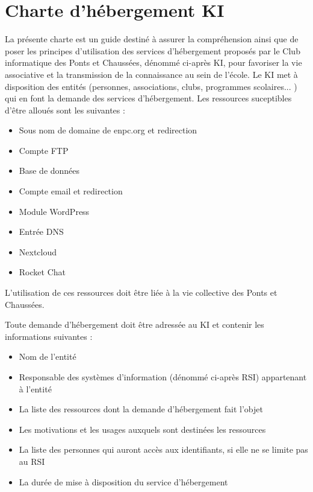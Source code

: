 \documentclass{ki019}
\begin{document}
\section{Charte d'hébergement KI}


La présente charte est un guide destiné à assurer la compréhension ainsi que de poser les principes d'utilisation des services d'hébergement proposés par le Club informatique des Ponts et Chaussées, dénommé ci-après KI, pour favoriser la vie associative et la transmission de la connaissance au sein de l'école. Le KI met à disposition des entités (personnes, associations, clubs, programmes scolaires... ) qui en font la demande des services d'hébergement. Les ressources suceptibles d'être alloués sont les suivantes :
\begin{itemize}
\item Sous nom de domaine de enpc.org et redirection
\item Compte FTP
\item Base de données
\item Compte email et redirection
\item Module WordPress
\item Entrée DNS
\item Nextcloud
\item Rocket Chat
\end{itemize}

L'utilisation de ces ressources doit être liée à la vie collective des Ponts et Chaussées.



Toute demande d'hébergement doit être adressée au KI et contenir les informations suivantes :
\begin{itemize}
\item Nom de l'entité
\item Responsable des systèmes d'information (dénommé ci-après RSI) appartenant à l'entité
\item La liste des ressources dont la demande d'hébergement fait l'objet
\item Les motivations et les usages auxquels sont destinées les ressources
\item La liste des personnes qui auront accès aux identifiants, si elle ne se limite pas au RSI
\item La durée de mise à disposition du service d'hébergement
\end{itemize}
\end{document}
